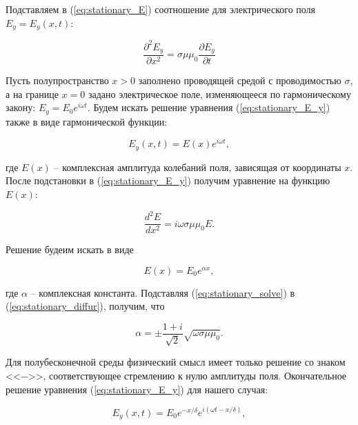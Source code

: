 \documentclass[a4paper, 12pt]{article}
\begin{document}
    Подставляем в (\ref{eq:stationary_E}) соотношение для электрического поля $E_y = E_y(x,t)$:
    
    \begin{equation}
        \frac{\partial^2 E_y}{\partial x^2} = \sigma\mu\mu_0\frac{\partial E_y}{\partial t}
        \label{eq:stationary_E_y}
    \end{equation}
    
    Пусть полупространство $x > 0$ заполнено проводящей средой с проводимостью $\sigma$, а на границе $x = 0$ задано электрическое поле, изменяющееся по гармоническому закону: $E_y = E_0 e^{i \omega t}$. Будем искать решение уравнения (\ref{eq:stationary_E_y}) также в виде гармонической функции:

    \begin{equation*}
        E_y(x,t) = E(x) e^{i \omega t},
    \end{equation*}

    где $E(x)$ -- комплексная амплитуда колебаний поля, зависящая от координаты $x$. После подстановки в (\ref{eq:stationary_E_y}) получим уравнение на функцию $E(x)$:

    \begin{equation}
        \frac{d^2 E}{dx^2} = i\omega\sigma\mu\mu_0 E.
        \label{eq:stationary_diffur}
    \end{equation}

    Решение будеим искать в виде

    \begin{equation}
        E(x) = E_0 e^{\alpha x},
        \label{eq:stationary_solve}
    \end{equation}

    где $\alpha$ -- комплексная константа. Подставляя (\ref{eq:stationary_solve}) в (\ref{eq:stationary_diffur}), получим, что

    \begin{equation}
        \alpha = \pm \frac{1+i}{\sqrt{2}} \sqrt{\omega\sigma\mu\mu_0}.
    \end{equation}

    Для полубесконечной среды физический смысл имеет только решение со знаком <<$-$>>, соответствующее стремлению к нулю амплитуды поля. Окончательное решение уравнения (\ref{eq:stationary_E_y}) для нашего случая:

    \begin{equation}
        E_y(x,t) = E_0 e^{-x/\delta} e^{i(\omega t - x/\delta)},
    \end{equation}
\end{document}
